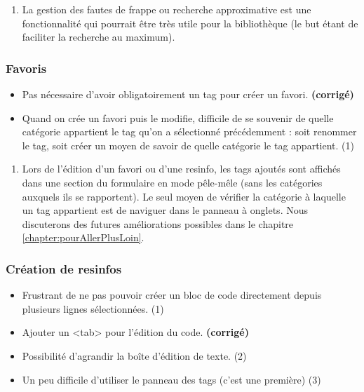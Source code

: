 \begin{enumerate}
    \item La gestion des fautes de frappe ou recherche approximative est une fonctionnalité qui pourrait être très utile pour la bibliothèque (le but étant de faciliter la recherche au maximum).
\end{enumerate}

\subsubsection*{Favoris}

\begin{itemize}
    \item Pas nécessaire d'avoir obligatoirement un tag pour créer un favori. \textbf{(corrigé)}
    \item Quand on crée un favori puis le modifie, difficile de se souvenir de quelle catégorie appartient le tag qu'on a sélectionné précédemment : soit renommer le tag, soit créer un moyen de savoir de quelle catégorie le tag appartient. (1)
\end{itemize}

\bigskip

\begin{enumerate}
    \item Lors de l'édition d'un favori ou d'une \gls{resinfo}, les \glspl{tag} ajoutés sont affichés dans une section du formulaire en mode pêle-mêle (sans les catégories auxquels ils se rapportent). Le seul moyen de vérifier la catégorie à laquelle un \gls{tag} appartient est de naviguer dans le panneau à onglets. Nous discuterons des futures améliorations possibles dans le chapitre \ref{chapter:pourAllerPlusLoin}.
\end{enumerate}


\subsubsection*{Création de \glspl{resinfo}}

\begin{itemize}
    \item Frustrant de ne pas pouvoir créer un bloc de code directement depuis plusieurs lignes sélectionnées. (1)
    \item Ajouter un <tab> pour l'édition du code. \textbf{(corrigé)}
    \item Possibilité d'agrandir la boîte d'édition de texte. (2)
    \item Un peu difficile d'utiliser le panneau des tags (c'est une première) (3)
\end{itemize}

